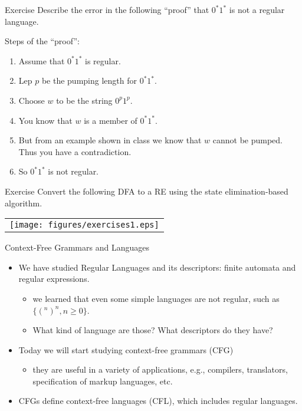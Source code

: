 \documentclass{prosper}%
\begin{document}
\begin{slide}{Exercise}
Describe the error in the following ``proof'' that $0^*1^*$ is not a regular language.

Steps of the ``proof'':
\begin{enumerate}
\item Assume that $0^*1^*$ is regular.
\item Lep $p$ be the pumping length for $0^*1^*$.
\item Choose $w$ to be the string $0^p1^p$.
\item You know that $w$ is a member of $0^*1^*$.
\item But from an example shown in class we know that $w$ cannot be pumped. Thus you have a contradiction. 
\item So $0^*1^*$ is not regular.
\end{enumerate}
\end{slide}

\begin{slide}{Exercise}
Convert the following DFA to a RE using the state elimination-based algorithm.
\begin{center}
\begin{tabular}{l}
\texttt{[image: figures/exercises1.eps]}\\
\end{tabular}
\end{center}
\end{slide}

\begin{slide}{Context-Free Grammars and Languages}
\begin{itemize}
\item We have studied Regular Languages and its descriptors: finite automata and regular expressions.
\begin{itemize}
\item we learned that even some simple languages are not regular, such as $\{(^n
)^n, n\geq 0\}$.
\item What kind of language are those? What descriptors do they have?
\end{itemize}
\item Today we will start studying {\blue context-free grammars} (CFG)\begin{itemize}
\item they are useful in a variety of applications, e.g., compilers, translators, specification of markup languages, etc.
\end{itemize}
\item CFGs define {\blue context-free languages} (CFL), which {\blue includes regular languages}.
\end{itemize}
\end{slide}
\end{document}
